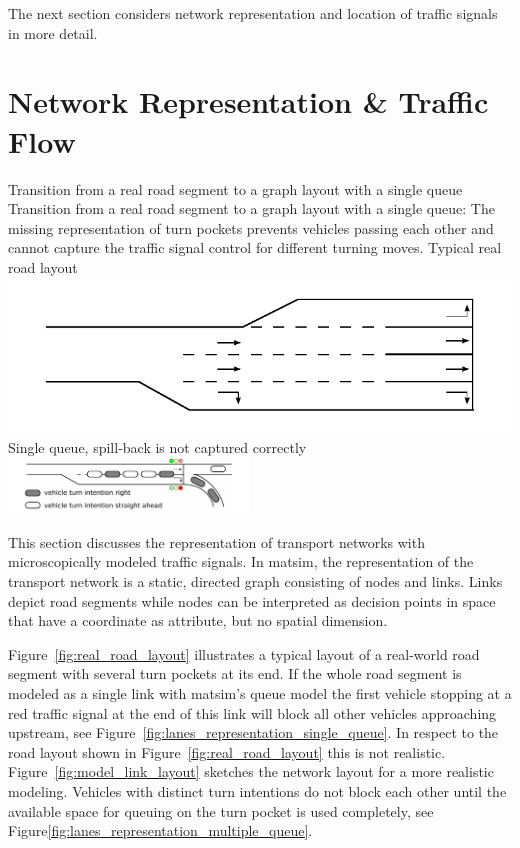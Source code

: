 The next section considers network representation and location of traffic signals in more detail. 

\section{Network Representation \& Traffic Flow}
\label{sec:signals_network_traffic_flow}

\createfigure%
{Transition from a real road segment to a graph layout with a single queue}%
{Transition from a real road segment to a graph layout with a single queue: The missing representation of turn pockets prevents vehicles passing each other and cannot capture the traffic signal control for different turning moves. }
{\label{fig:combined_model}}
{%
  \createsubfigure%
	{Typical real road layout}
	{\includegraphics[width=0.475\linewidth]{extending/figures/signalslanes/real_road_layout.pdf}}
	{\label{fig:real_road_layout}}
  \createsubfigure%
	{Single queue, spill-back is not captured correctly}%
	{\includegraphics[width=0.48\textwidth]{extending/figures/signalslanes/single_queue_model_inkscape.pdf}}%
	{\label{fig:lanes_representation_single_queue}}%
}%
{\citet{Grether2014PhD}}

This section discusses the representation of transport networks with microscopically modeled traffic signals. 
In \gls{matsim}, the representation of the transport network is a static, directed graph consisting of nodes and links. 
Links depict road segments while nodes can be interpreted as decision points in space that have a coordinate as attribute, but no spatial dimension. 

Figure~\ref{fig:real_road_layout} illustrates a typical layout of a real-world road segment with several turn pockets at its end. 
If the whole road segment is modeled as a single link with \gls{matsim}'s queue model the first vehicle stopping at a red traffic signal at the end of this link will block all other vehicles approaching upstream, see Figure~\ref{fig:lanes_representation_single_queue}. 
In respect to the road layout shown in Figure~\ref{fig:real_road_layout} this is not realistic. 
Figure~\ref{fig:model_link_layout} sketches the network layout for a more realistic modeling. 
Vehicles with distinct turn intentions do not block each other until the available space for queuing on the turn pocket is used completely, see Figure\ref{fig:lanes_representation_multiple_queue}. 

